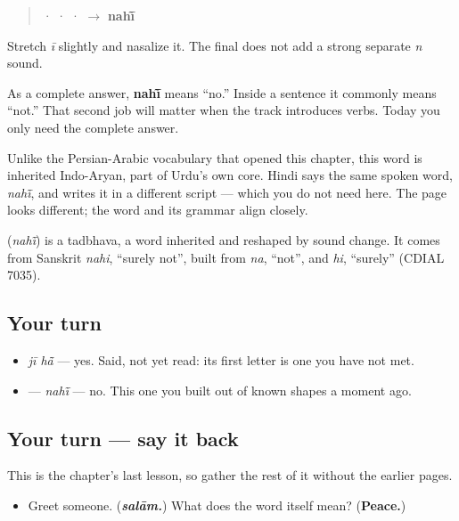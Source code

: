 \begin{quote}
 ·  ·  ·  $\to$ \textbf{nahī̃}
\end{quote}

Stretch \emph{ī} slightly and nasalize it. The final \textbf{} does not add a strong separate \emph{n} sound.

\begin{grammarlens}[title={Grammar Lens: one word, two future jobs}]
As a complete answer, \textbf{nahī̃} means “no.” Inside a sentence it commonly means “not.” That second job will matter when the track introduces verbs. Today you only need the complete answer.

Unlike the Persian-Arabic vocabulary that opened this chapter, this word is inherited Indo-Aryan, part of Urdu's own core. Hindi says the same spoken word, \emph{nahī̃}, and writes it in a different script — which you do not need here. The page looks different; the word and its grammar align closely.
\end{grammarlens}

\begin{cousinweb}
\textbf{} (\emph{nahī̃}) is a tadbhava, a word inherited and reshaped by sound change. It comes from Sanskrit \emph{nahi}, \textquotedblleft{}surely not\textquotedblright{}, built from \emph{na}, \textquotedblleft{}not\textquotedblright{}, and \emph{hi}, \textquotedblleft{}surely\textquotedblright{} (CDIAL 7035).
\end{cousinweb}

\subsection*{Your turn}
\begin{itemize}
\raggedright
  \item \emph{jī hā̃} — yes. Said, not yet read: its first letter is one you have not met.
  \item \textbf{} — \emph{nahī̃} — no. This one you built out of known shapes a moment ago.
\end{itemize}

\subsection*{Your turn — say it back}
This is the chapter's last lesson, so gather the rest of it without the earlier pages.

\begin{itemize}
\raggedright
  \item Greet someone. (\emph{\textbf{salām.}}) What does the word itself mean? (\textbf{Peace.})
\end{itemize}

